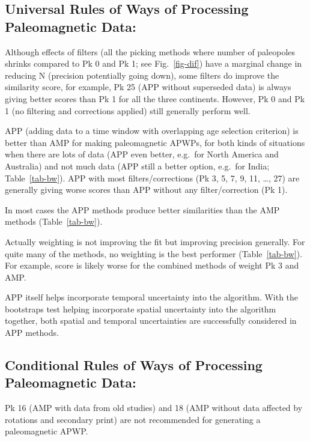 \subsection{Universal Rules of Ways of Processing Paleomagnetic Data:}
%
\begin{description}
  \item Although effects of filters (all the picking methods where number of
	paleopoles shrinks compared to Pk 0 and Pk 1; see Fig.~\ref{fig-dif}) have a
	marginal change in reducing N (precision potentially going down), some
	filters do improve the similarity score, for example, Pk 25 (APP without
	superseded data) is always giving better scores than Pk 1 for all the
	three continents. However, Pk 0 and Pk 1 (no filtering and corrections
	applied) still generally perform well.
  \item APP (adding data to a time window with overlapping age selection
	criterion) is better than AMP for making paleomagnetic APWPs, for both kinds
	of situations when there are lots of data (APP even better, e.g.\ for North
	America and Australia) and not much data (APP still a better option, e.g.\
	for India; Table~\ref{tab-bw}). APP with most filters/corrections (Pk 3, 5,
	7, 9, 11, \ldots, 27) are generally giving worse scores than APP without any
	filter/correction (Pk 1).
  \item In most cases the APP methods produce better similarities than the AMP
	methods (Table~\ref{tab-bw}).
  \item Actually weighting is not improving the fit but improving precision
	generally. For quite many of the methods, no weighting is the best performer
	(Table~\ref{tab-bw}). For example, score is likely worse for the combined
	methods of weight Pk 3 and AMP\@.
  \item APP itself helps incorporate temporal uncertainty into the algorithm.
	With the bootstraps test helping incorporate spatial uncertainty into the
	algorithm together, both spatial and temporal uncertainties are successfully
	considered in APP methods.
\end{description}

\subsection{Conditional Rules of Ways of Processing Paleomagnetic Data:}
%
\begin{description}
  \item Pk 16 (AMP with data from old studies) and 18 (AMP
	without data affected by rotations and secondary print) are not recommended
	for generating a paleomagnetic APWP\@.
\end{description}

